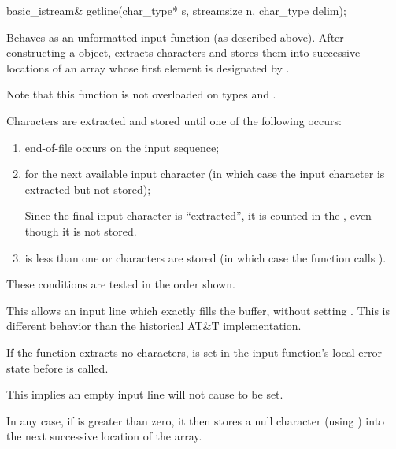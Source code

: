 %
\begin{itemdecl}
basic_istream& getline(char_type* s, streamsize n, char_type delim);
\end{itemdecl}

\begin{itemdescr}
\pnum
\effects
Behaves as an unformatted input function
(as described above).
After constructing a  object, extracts
characters and stores them
into successive locations of an array whose first element is designated by
.
\begin{footnote}
Note that this function is not overloaded on types
and
.
\end{footnote}
Characters are extracted and stored until one of the following occurs:
\begin{enumerate}
\item
end-of-file occurs on the input sequence;
\item
{}
for the next available input
character 
(in which case the input character is extracted but not stored);
\begin{footnote}
Since
the final input character is ``extracted'',
it is counted in the
,
even though it is not stored.
\end{footnote}
\item
{} is less than one or 
characters are stored
(in which case the function calls
).
\end{enumerate}

\pnum
These conditions are tested in the order shown.
\begin{footnote}
This allows an input
line which exactly fills the buffer, without setting
.
This is different behavior than the historical AT\&T implementation.
\end{footnote}

\pnum
If the function extracts no characters,
 is set in the input function's local error state
before  is called.
\begin{footnote}
This implies an
empty input line will not cause
to be set.
\end{footnote}

\pnum
In any case, if  is greater than zero, it then stores a null character
(using
)
into the next successive location of the array.


\end{itemdescr}
